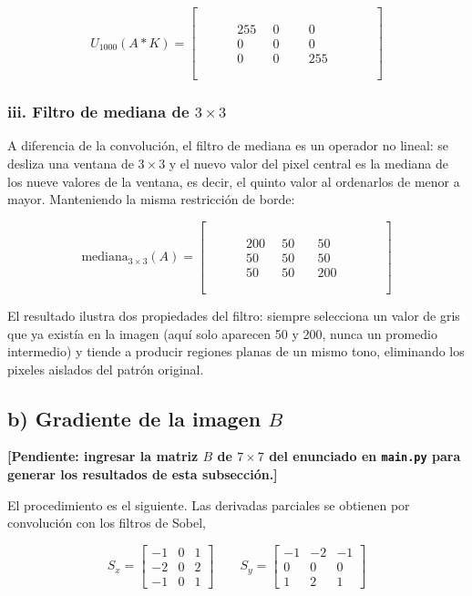 \documentclass[12pt, a4paper]{article}
\newcommand{\vacia}{\phantom{0000}}
\begin{document}
\[
U_{1000}(A * K) =
\begin{bmatrix}
\vacia & \vacia & \vacia & \vacia & \vacia \\
\vacia & 255 & 0 & 0 & \vacia \\
\vacia & 0 & 0 & 0 & \vacia \\
\vacia & 0 & 0 & 255 & \vacia \\
\vacia & \vacia & \vacia & \vacia & \vacia
\end{bmatrix}
\]

\subsubsection*{iii. Filtro de mediana de $3 \times 3$}

A diferencia de la convolución, el filtro de mediana es un operador no lineal: se desliza una ventana de $3 \times 3$ y el nuevo valor del pixel central es la mediana de los nueve valores de la ventana, es decir, el quinto valor al ordenarlos de menor a mayor. Manteniendo la misma restricción de borde:

\[
\text{mediana}_{3\times3}(A) =
\begin{bmatrix}
\vacia & \vacia & \vacia & \vacia & \vacia \\
\vacia & 200 & 50 & 50 & \vacia \\
\vacia & 50 & 50 & 50 & \vacia \\
\vacia & 50 & 50 & 200 & \vacia \\
\vacia & \vacia & \vacia & \vacia & \vacia
\end{bmatrix}
\]

El resultado ilustra dos propiedades del filtro: siempre selecciona un valor de gris que ya existía en la imagen (aquí solo aparecen 50 y 200, nunca un promedio intermedio) y tiende a producir regiones planas de un mismo tono, eliminando los pixeles aislados del patrón original.

\subsection{b) Gradiente de la imagen $B$}

\textbf{[Pendiente: ingresar la matriz $B$ de $7 \times 7$ del enunciado en \texttt{main.py} para generar los resultados de esta subsección.]}

El procedimiento es el siguiente. Las derivadas parciales se obtienen por convolución con los filtros de Sobel,

\[
S_x =
\begin{bmatrix}
-1 & 0 & 1 \\
-2 & 0 & 2 \\
-1 & 0 & 1
\end{bmatrix}
\qquad
S_y =
\begin{bmatrix}
-1 & -2 & -1 \\
0 & 0 & 0 \\
1 & 2 & 1
\end{bmatrix}
\]
\end{document}
